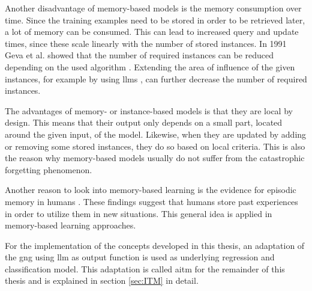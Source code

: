 Another disadvantage of memory-based models is the memory consumption over time. Since the training examples need to be stored in order to be retrieved later, a lot of memory can be consumed. This can lead to increased query and update times, since these scale linearly with the number of stored instances. In 1991 Geva et al. showed that the number of required instances can be reduced depending on the used algorithm \cite{protReduction}. Extending the area of influence of the given instances, for example by using \glspl{llm} \cite{LLM}, can further decrease the number of required instances.

The advantages of memory- or instance-based models is that they are local by design. This means that their output only depends on a small part, located around the given input, of the model. Likewise, when they are updated by adding or removing some stored instances, they do so based on local criteria. This is also the reason why memory-based models usually do not suffer from the catastrophic forgetting phenomenon.

Another reason to look into memory-based learning is the evidence for episodic memory in humans \cite{tulving2002episodic}. 
These findings suggest that humans store past experiences in order to utilize them in new situations. This general idea is applied in memory-based learning approaches.

For the implementation of the concepts developed in this thesis, an adaptation of the \gls{gng} using \gls{llm} as output function is used as underlying regression and classification model. This adaptation is called \gls{aitm} for the remainder of this thesis and is explained in section \ref{sec:ITM} in detail.

%
%
%

